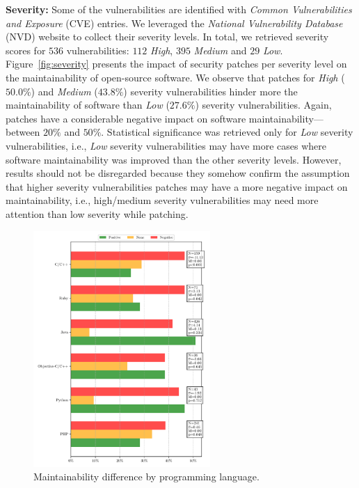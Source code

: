 \documentclass[smallextended]{svjour3}       %
\begin{document}
\textbf{Severity:} Some of the vulnerabilities are identified with 
\emph{Common Vulnerabilities and Exposure} (CVE) entries. We 
leveraged the \emph{National Vulnerability Database} (NVD) website 
to collect their severity levels. In total, we retrieved severity 
scores for $536$ vulnerabilities: $112$ \emph{High}, $395$ 
\emph{Medium} and $29$ \emph{Low}. Figure~\ref{fig:severity} 
presents the impact of security patches per severity level on the 
maintainability of open-source software. We observe that patches for 
\emph{High} ($50.0\%$) and \emph{Medium} ($43.8\%$) severity 
vulnerabilities hinder more the maintainability of software than 
\emph{Low} ($27.6\%$) severity vulnerabilities. Again, patches have 
a considerable negative impact on software maintainability---between 
$20\%$ and $50\%$. Statistical significance was retrieved only for 
\emph{Low} severity vulnerabilities, i.e., \emph{Low} severity 
vulnerabilities may have more cases where software maintainability was improved than the 
other severity levels. However, results should not be disregarded 
because they somehow confirm the 
assumption that higher severity vulnerabilities patches may have a 
more negative impact on maintainability, i.e., high/medium 
severity vulnerabilities may need more attention than low severity while 
patching.


\begin{figure}[htp]
  \centering
  \includegraphics[width=0.6\textwidth]{figures/main_per_language.pdf}
  \caption{Maintainability difference by programming language.}
  \label{fig:lang_main}    
\end{figure}
\end{document}
